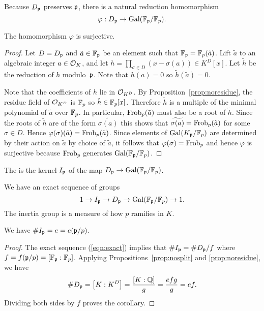 Because $D_{\mathfrak{p}}$ preserves $\mathfrak{p}$, there is a natural reduction homomorphism
\[
  \varphi:D_{\mathfrak{p}} \to \operatorname{Gal}(\mathbb{F}_{\mathfrak{p}}/\mathbb{F}_p).
\]
\begin{theorem}\label{thm:redsurj}
  The homomorphism $\varphi$ is surjective.
\end{theorem}
\begin{proof}
  Let $D = D_{\mathfrak{p}}$ and $\tilde{a} \in \mathbb{F}_{\mathfrak{p}}$ be an element
  such that $\mathbb{F}_{\mathfrak{p}} = \mathbb{F}_p(\tilde{a})$.
  Lift $\tilde{a}$ to an algebraic integer $a\in \mathcal{O}_K$, and let
  $h = \prod_{\sigma \in D}(x-\sigma(a))\in K^D[x]$.
  Let $\tilde{h}$ be the reduction of $h$ modulo~$\mathfrak{p}$.
  Note that $h(a) = 0$ so $\tilde{h}(\tilde{a}) = 0$.

  Note that the coefficients of $h$ lie in $\mathcal{O}_{K^D}$.
  By Proposition~\ref{prop:noresidue}, the residue field of $\mathcal{O}_{K^D}$
  is $\mathbb{F}_p$ so $\tilde{h} \in \mathbb{F}_p[x]$.
  Therefore $\tilde{h}$ is a multiple of the minimal polynomial of
  $\tilde{a}$ over $\mathbb{F}_p$. In particular, $\operatorname{Frob}_p(\tilde{a})$
  must also be a root of $\tilde{h}$.
  Since the roots of $\tilde{h}$ are of the form $\widetilde{\sigma(a)}$
  this shows that $\widetilde{\sigma(a)} = \operatorname{Frob}_p(\tilde{a})$
  for some $\sigma\in D$.
  Hence $\varphi(\sigma)(\tilde{a}) = \operatorname{Frob}_p(\tilde{a})$. Since elements
  of $\operatorname{Gal}(K_{\mathfrak{p}}/\mathbb{F}_p)$ are determined by their action on $\tilde{a}$
  by choice of $\tilde{a}$, it follows that $\varphi(\sigma) = \operatorname{Frob}_p$
  and hence $\varphi$ is surjective because $\operatorname{Frob}_p$
  generates $\operatorname{Gal}(\mathbb{F}_{\mathfrak{p}}/\mathbb{F}_p)$.
\end{proof}

\begin{definition}
  The 
  is the kernel $I_{\mathfrak{p}}$ of the map $D_{\mathfrak{p}} \to \operatorname{Gal}(\mathbb{F}_{\mathfrak{p}}/\mathbb{F}_p)$.
\end{definition}
We have an exact sequence of groups
\begin{equation}\label{eqn:exact}
  1 \to I_{\mathfrak{p}} \to D_{\mathfrak{p}} \to \operatorname{Gal}(\mathbb{F}_{\mathfrak{p}}/\mathbb{F}_p)\to 1.
\end{equation}
The inertia group is a measure of how $p$ ramifies in $K$.
\begin{corollary}
  We have $\# I_{\mathfrak{p}} = e = e(\mathfrak{p}/p)$.
\end{corollary}
\begin{proof}
  The exact sequence (\ref{eqn:exact}) implies that
  $\#I_{\mathfrak{p}} = \#D_{\mathfrak{p}} / f$ where $f = f(\mathfrak{p}/p) = [\mathbb{F}_{\mathfrak{p}} : \mathbb{F}_p]$.
  Applying Propositions~\ref{prop:nosplit} and \ref{prop:noresidue}, we have
  \[
    \#D_{\mathfrak{p}} = \left[K : K^D\right] = \frac{[K:\mathbb{Q}]}{g} = \frac{efg}{g} = ef.
  \]
  Dividing both sides by $f$ proves the corollary.
\end{proof}

